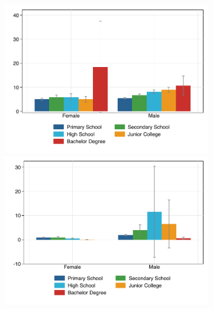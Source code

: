 \documentclass[11pt,letterpaper]{article}
\begin{document}
\begin{figure}[H]
\begin{subfigure}[b]{0.33\linewidth}
		\vspace{-2.5em}
		\newline {} 
		\includegraphics[width=1\linewidth]{../../empirical/CSES2017/Appendix/Graphs/educ_cc}
		\vspace{-2.5em}
		\newline {} 
		\includegraphics[width=1\linewidth]{../../empirical/CSES2017/Appendix/Graphs/educ_asset} 
		\vspace{-2.5em}
		\newline {}

\end{subfigure}
\end{figure}
\end{document}
